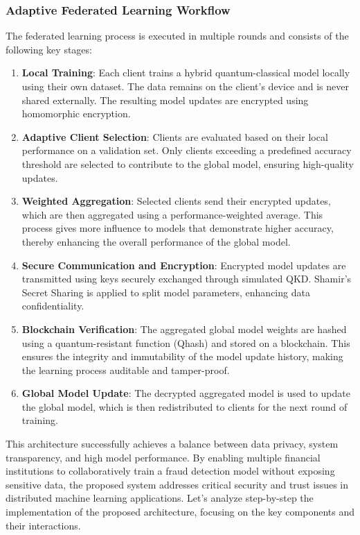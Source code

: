 \documentclass[10pt]{article}
\begin{document}
\subsubsection{Adaptive Federated Learning Workflow}
The federated learning process is executed in multiple rounds and consists of the following key stages:
\begin{enumerate}
	\item \textbf{Local Training}: Each client trains a hybrid quantum-classical model locally using their own dataset. The data remains on the client’s device and is never shared externally. The resulting model updates are encrypted using homomorphic encryption.
	\item \textbf{Adaptive Client Selection}: Clients are evaluated based on their local performance on a validation set. Only clients exceeding a predefined accuracy threshold are selected to contribute to the global model, ensuring high-quality updates.
	\item \textbf{Weighted Aggregation}: Selected clients send their encrypted updates, which are then aggregated using a performance-weighted average. This process gives more influence to models that demonstrate higher accuracy, thereby enhancing the overall performance of the global model.
	\item \textbf{Secure Communication and Encryption}: Encrypted model updates are transmitted using keys securely exchanged through simulated QKD. Shamir's Secret Sharing is applied to split model parameters, enhancing data confidentiality.
	\item \textbf{Blockchain Verification}: The aggregated global model weights are hashed using a quantum-resistant function (Qhash) and stored on a blockchain. This ensures the integrity and immutability of the model update history, making the learning process auditable and tamper-proof.
	\item \textbf{Global Model Update}: The decrypted aggregated model is used to update the global model, which is then redistributed to clients for the next round of training.
\end{enumerate}
This architecture successfully achieves a balance between data privacy, system transparency, and high model performance. By enabling multiple financial institutions to collaboratively train a fraud detection model without exposing sensitive data, the proposed system addresses critical security and trust issues in distributed machine learning applications.
Let's analyze step-by-step the implementation of the proposed architecture, focusing on the key components and their interactions.
\end{document}
